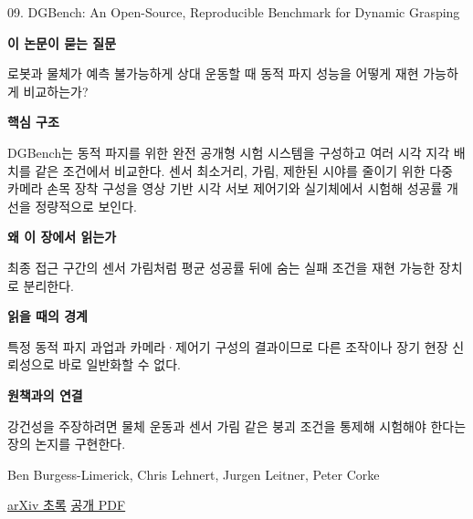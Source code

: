 \documentclass[11pt,openany]{book}
\begin{document}
\begin{termcard}{09. DGBench: An Open-Source, Reproducible Benchmark for Dynamic Grasping}

\par

\medskip

{\sffamily\bfseries\color{deepblue} 이 논문이 묻는 질문}\par

로봇과 물체가 예측 불가능하게 상대 운동할 때 동적 파지 성능을 어떻게 재현 가능하게 비교하는가?

\smallskip

{\sffamily\bfseries\color{deepblue} 핵심 구조}\par

DGBench는 동적 파지를 위한 완전 공개형 시험 시스템을 구성하고 여러 시각 지각 배치를 같은 조건에서 비교한다. 센서 최소거리, 가림, 제한된 시야를 줄이기 위한 다중 카메라 손목 장착 구성을 영상 기반 시각 서보 제어기와 실기체에서 시험해 성공률 개선을 정량적으로 보인다.

\smallskip

{\sffamily\bfseries\color{deepblue} 왜 이 장에서 읽는가}\par

최종 접근 구간의 센서 가림처럼 평균 성공률 뒤에 숨는 실패 조건을 재현 가능한 장치로 분리한다.

\smallskip

{\sffamily\bfseries\color{coral} 읽을 때의 경계}\par

특정 동적 파지 과업과 카메라·제어기 구성의 결과이므로 다른 조작이나 장기 현장 신뢰성으로 바로 일반화할 수 없다.

\smallskip

{\sffamily\bfseries\color{teal} 원책과의 연결}\par

강건성을 주장하려면 물체 운동과 센서 가림 같은 붕괴 조건을 통제해 시험해야 한다는 장의 논지를 구현한다.

\medskip

{\footnotesize\color{muted} Ben Burgess-Limerick, Chris Lehnert, Jurgen Leitner, Peter Corke\par

\href{https://arxiv.org/abs/2204.13879}{arXiv 초록} \quad \href{https://arxiv.org/pdf/2204.13879}{공개 PDF}\par}

\end{termcard}
\end{document}
